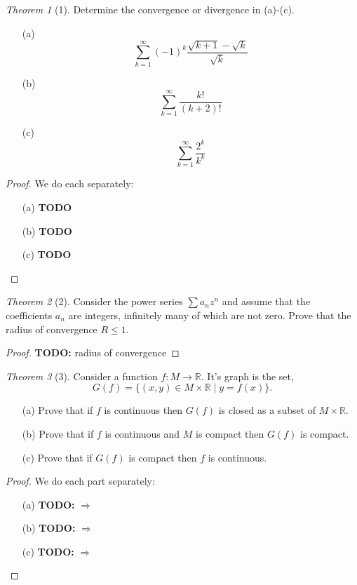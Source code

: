 \documentclass[12pt]{article}
\theoremstyle{remark}
\theoremstyle{named}
\newtheorem*{theorem}{Theorem}
\renewcommand{\implies}{\Rightarrow}
\begin{document}
\begin{theorem}[1]
    Determine the convergence or divergence in (a)-(c).
    \begin{enumerate}
        \item[(a)] 
        \[\sum_{k = 1}^\infty (-1)^k \frac{\sqrt{k + 1} - \sqrt{k}}{\sqrt{k}}\]
        \item[(b)] \[\sum_{k = 1}^\infty \frac{k!}{(k + 2)!}\]
        \item[(c)] \[\sum_{k = 1}^\infty \frac{2^k}{k^k}\]
    \end{enumerate}
\end{theorem}

\begin{proof}
    We do each separately:
    \begin{enumerate}
        \item[(a)] \textbf{TODO}
        \item[(b)] \textbf{TODO}
        \item[(c)] \textbf{TODO}
    \end{enumerate}
\end{proof}

\begin{theorem}[2]
    Consider the power series \(\sum a_n z^n\) and assume that the coefficients \(a_n\) are integers, infinitely many of which are not zero. Prove that the radius of convergence \(R \le 1\).
\end{theorem}

\begin{proof}
    \textbf{TODO:} radius of convergence
\end{proof}

\begin{theorem}[3]
    Consider a function \(f : M \to \mathbb R\). It's graph is the set,
    \[G(f) = \{(x, y) \in M \times \mathbb R \mid y = f(x)\}.\]
    \begin{enumerate}
        \item[(a)] Prove that if \(f\) is continuous then \(G(f)\) is closed as a subset of \(M \times \mathbb R\). 
        \item[(b)] Prove that if \(f\) is continuous and \(M\) is compact then \(G(f)\) is compact.
        \item[(c)] Prove that if \(G(f)\) is compact then \(f\) is continuous. 
    \end{enumerate}
\end{theorem}

\begin{proof}
    We do each part separately:
    \begin{enumerate}
        \item[(a)] \textbf{TODO:} \(\implies\)
        \item[(b)] \textbf{TODO:} \(\implies\)
        \item[(c)] \textbf{TODO:} \(\implies\)
    \end{enumerate}    
\end{proof}
\end{document}

